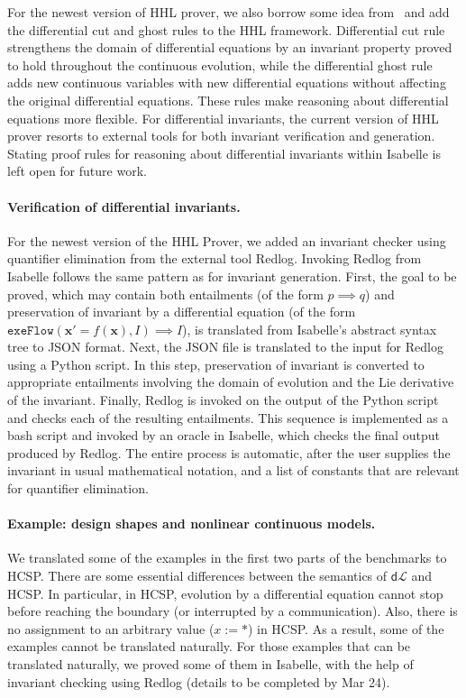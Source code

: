 \documentclass[runningheads,a4paper]{llncs}
\newcommand{\dL}{\mathsf{d}\mathcal{L}}
\begin{document}
For the newest version of HHL prover, we also borrow some idea
from~\cite{Platzer18} and add the differential cut and ghost rules to
the HHL framework. Differential cut rule strengthens the domain of
differential equations by an invariant property proved to hold
throughout the continuous evolution, while the differential ghost rule
adds new continuous variables with new differential equations without
affecting the original differential equations. These rules make
reasoning about differential equations more flexible. For differential
invariants, the current version of HHL prover resorts to external
tools for both invariant verification and generation. Stating proof
rules for reasoning about differential invariants within Isabelle is
left open for future work.

\paragraph{Verification of differential invariants.}

For the newest version of the HHL Prover, we added an invariant
checker using quantifier elimination from the external tool
Redlog. Invoking Redlog from Isabelle follows the same pattern as for
invariant generation. First, the goal to be proved, which may contain
both entailments (of the form $p\implies q$) and preservation of
invariant by a differential equation (of the form
$\mathtt{exeFlow}(\mathbf{x'}=f(\mathbf{x}),I)\implies I$), is
translated from Isabelle's abstract syntax tree to JSON format. Next,
the JSON file is translated to the input for Redlog using a Python
script. In this step, preservation of invariant is converted to
appropriate entailments involving the domain of evolution and the Lie
derivative of the invariant. Finally, Redlog is invoked on the output
of the Python script and checks each of the resulting
entailments. This sequence is implemented as a bash script and invoked
by an oracle in Isabelle, which checks the final output produced by
Redlog. The entire process is automatic, after the user supplies the
invariant in usual mathematical notation, and a list of constants that
are relevant for quantifier elimination.

\paragraph{Example: design shapes and nonlinear continuous models.}

We translated some of the examples in the first two parts of the
benchmarks to HCSP. There are some essential differences between the
semantics of $\dL$ and HCSP. In particular, in HCSP, evolution by a
differential equation cannot stop before reaching the boundary (or
interrupted by a communication). Also, there is no assignment to an
arbitrary value ($x := *$) in HCSP. As a result, some of the examples
cannot be translated naturally. For those examples that can be
translated naturally, we proved some of them in Isabelle, with the
help of invariant checking using Redlog (details to be completed by
Mar 24).
\end{document}
